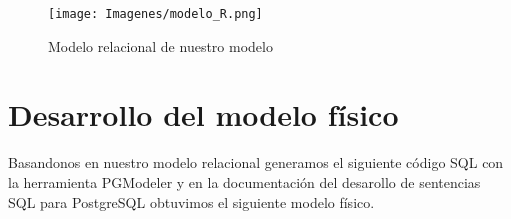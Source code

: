 \documentclass[10pt,openany]{book}
\begin{document}
\begin{figure}[H]
    \begin{center}
        \texttt{[image: Imagenes/modelo\_R.png]}
        \caption{Modelo relacional de nuestro modelo}
    \end{center}
\end{figure}


\section{Desarrollo del modelo físico}

Basandonos en nuestro modelo relacional generamos el siguiente código SQL con la herramienta PGModeler y en la documentación del desarollo de sentencias SQL para PostgreSQL \nocite{PostgreSQL_DDL}obtuvimos el siguiente modelo físico.
\end{document}
